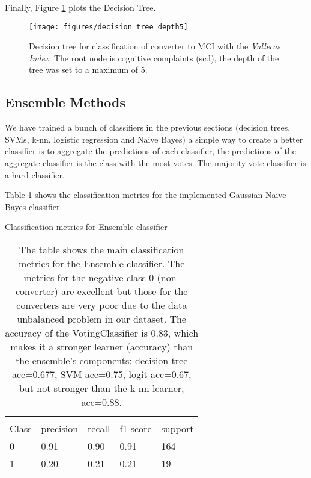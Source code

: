 \documentclass[11pt]{article}
\theoremstyle{definition}
\theoremstyle{remark}
\begin{document}
Finally, Figure \ref{fig:dt-md5-dot} plots the Decision Tree. 
\begin{figure}[H]
        \centering
        \texttt{[image: figures/decision\_tree\_depth5]}
        \caption{Decision tree for classification of converter to MCI with the \emph{Vallecas Index}. The root node is cognitive complaints (scd), the depth of the tree was set to a maximum of 5.
        } \label{fig:dt-md5-dot}
\end{figure}


\subsection{Ensemble Methods}
\label{se:resensemble}

We have trained a bunch of classifiers in the previous sections (decision trees, SVMs, k-nn, logistic regression and Naive Bayes) a simple way to create a better classifier is to aggregate the predictions of each classifier, the predictions of the aggregate classifier is the class with the most votes. The majority-vote classifier is a hard classifier. 


Table \ref{tab:ensemble} shows the classification metrics for the implemented Gaussian Naive Bayes classifier.
\begin{table}[H]
\caption{Classification metrics for Ensemble classifier}
\begin{center} 
\begin{tabular}{lllll}
\hline
\multicolumn{1}{c}{} \\
Class & precision & recall & f1-score & support     \\
\hline
0 & 0.91  &    0.90   &   0.91   &    164 \\
1 & 0.20  &    0.21   &   0.21   &    19 \\
\hline
\end{tabular}
\caption{The table shows the main classification metrics for the Ensemble classifier. The metrics for the negative class 0 (non-converter) are excellent but those for the converters are very poor due to the data unbalanced problem in our dataset.
The accuracy of the VotingClassifier is 0.83, which makes it a stronger learner (accuracy) than the ensemble's components: decision tree acc=0.677, SVM acc=0.75, logit acc=0.67, but not stronger than the k-nn learner, acc=0.88.
}  \label{tab:ensemble} 
\end{center}
\end{table}
\end{document}
